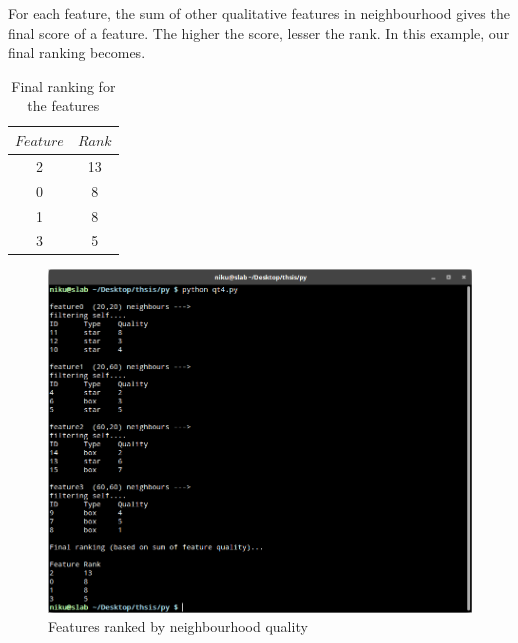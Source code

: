 \newline
\par For each feature, the sum of other qualitative features in neighbourhood gives the final score of a feature. The higher the score, lesser the rank. In this example, our final ranking becomes.
\begin{table}[h]
    \centering
    \begin{tabular}{|c|c|}
        \hline
         $Feature$&$Rank$\\
         \hline
         2&13\\
         \hline
         0 & 8 \\
         \hline
         1 & 8\\
         \hline
         3 & 5\\
         \hline
    \end{tabular}
    \caption{Final ranking for the features}
    \label{tab:my_label}
\end{table}
\newline
\begin{figure}[h]
    \centering
    \includegraphics[width=\textwidth]{pix/p12}
    \caption{Features ranked by neighbourhood quality}
    \label{feature_ranking}
\end{figure}
\newline

